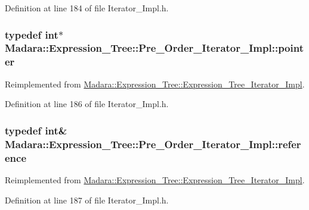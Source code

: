 Definition at line 184 of file Iterator\_\-Impl.h.

\hypertarget{classMadara_1_1Expression__Tree_1_1Pre__Order__Iterator__Impl_a0ac33eb70ba2854c0d3bf92401860fd8}{
\subsubsection[{pointer}]{\setlength{\rightskip}{0pt plus 5cm}typedef int$\ast$ {\bf Madara::Expression\_\-Tree::Pre\_\-Order\_\-Iterator\_\-Impl::pointer}}}
\label{d0/dfb/classMadara_1_1Expression__Tree_1_1Pre__Order__Iterator__Impl_a0ac33eb70ba2854c0d3bf92401860fd8}


Reimplemented from \hyperlink{classMadara_1_1Expression__Tree_1_1Expression__Tree__Iterator__Impl_a33e128179eed32fd363d0f426ed313a1}{Madara::Expression\_\-Tree::Expression\_\-Tree\_\-Iterator\_\-Impl}.



Definition at line 186 of file Iterator\_\-Impl.h.

\hypertarget{classMadara_1_1Expression__Tree_1_1Pre__Order__Iterator__Impl_a5cc08adff5382552f5af26d092559270}{
\subsubsection[{reference}]{\setlength{\rightskip}{0pt plus 5cm}typedef int\& {\bf Madara::Expression\_\-Tree::Pre\_\-Order\_\-Iterator\_\-Impl::reference}}}
\label{d0/dfb/classMadara_1_1Expression__Tree_1_1Pre__Order__Iterator__Impl_a5cc08adff5382552f5af26d092559270}


Reimplemented from \hyperlink{classMadara_1_1Expression__Tree_1_1Expression__Tree__Iterator__Impl_adbfbf382a07c981d136ea739c913aeab}{Madara::Expression\_\-Tree::Expression\_\-Tree\_\-Iterator\_\-Impl}.



Definition at line 187 of file Iterator\_\-Impl.h.

